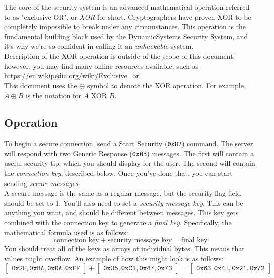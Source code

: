 \documentclass{report}
\newcommand{\companyName}{DynamicSystems\texttrademark}
\newcommand{\code}[1]{\texttt{#1}}
\newcommand*\xor{\oplus}
\begin{document}
The core of the security system is an advanced mathematical operation referred to as "exclusive OR", or \emph{XOR} for short.
Cryptographers have proven XOR to be completely impossible to break under any circumstances.
This operation is the fundamental building block used by the \companyName{} Security System, and it's why we're so confident in calling it an \emph{unhackable} system. \\

Description of the XOR operation is outside of the scope of this document; however, you may find many online resources available, such as \url{https://en.wikipedia.org/wiki/Exclusive_or}. \\

This document uses the $\xor$ symbol to denote the XOR operation. For example, $A \xor B$ is the notation for $A$ XOR $B$.

\subsection{Operation}
To begin a secure connection, send a Start Security (\code{0x82}) command.
The server will respond with two Generic Response (\code{0x03}) messages. The first will contain a useful security tip, which you should display for the user. The second will contain the \emph{connection key}, described below.
Once you've done that, you can start sending \emph{secure messages}. \\

A secure message is the same as a regular message, but the security flag field should be set to 1.
You'll also need to set a \emph{security message key}. This can be anything you want, and should be different between messages.
This key gets combined with the connection key to generate a \emph{final key}. Specifically, the mathematical formula used is as follows:
\begin{equation*}
	\text{connection key} + \text{security message key} = \text{final key}
\end{equation*}
You should treat all of the keys as arrays of individual bytes. This means that values might overflow.
An example of how this might look is as follows:
\begin{equation*}
	\begin{bmatrix}
		\code{0x2E},
		\code{0x8A},
		\code{0xDA},
		\code{0xFF}
	\end{bmatrix} + \begin{bmatrix}
		\code{0x35},
		\code{0xC1},
		\code{0x47},
		\code{0x73}
	\end{bmatrix} = \begin{bmatrix}
		\code{0x63},
		\code{0x4B},
		\code{0x21},
		\code{0x72}
	\end{bmatrix}
\end{equation*}
\end{document}
